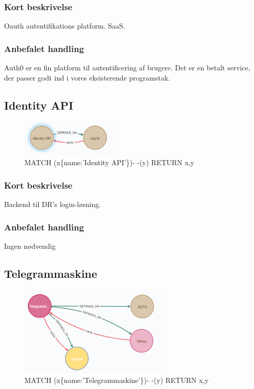 \documentclass{article}
\begin{document}
\subsubsection*{Kort beskrivelse}
Oauth autentifikations platform. SaaS.
\subsubsection*{Anbefalet handling}
Auth0 er en fin platform til autentificering af brugere. Det er en betalt service, der passer godt ind i vores eksisterende programstak. 



\subsection{Identity API}
\begin{figure}[h]
\includegraphics[width=130pt]{Identity.PNG}
\caption{MATCH (x\{name:'Identity API'\})- -(y) RETURN x,y}
\end{figure}
\subsubsection*{Kort beskrivelse}
Backend til DR's login-løsning.
\subsubsection*{Anbefalet handling}
Ingen nødvendig


\subsection{Telegrammaskine}
\begin{figure}[h]
\includegraphics[width=200pt]{Telegrammaskine.PNG}
\caption{MATCH (x\{name:'Telegrammaskine'\})- -(y) RETURN x,y}
\end{figure}
\end{document}
